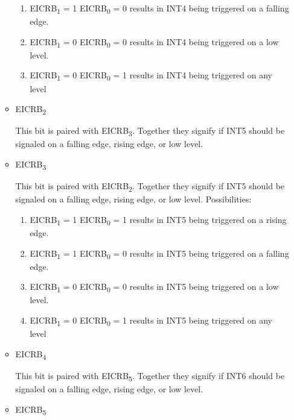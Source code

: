 \documentclass[12pt,letterpaper]{article}
\begin{document}
\begin{enumerate}
\begin{itemize}
\begin{enumerate}
				\item
				EICRB\textsubscript{1} = 1 EICRB\textsubscript{0} = 0 results in INT4 being triggered on a falling edge.
				
				\item
				EICRB\textsubscript{1} = 0 EICRB\textsubscript{0} = 0 results in INT4 being triggered on a low level.
				
				\item
				EICRB\textsubscript{1} = 0 EICRB\textsubscript{0} = 1 results in INT4 being triggered on any level
			\end{enumerate}

			\item
			EICRB\textsubscript{2}
			
			This bit is paired with EICRB\textsubscript{3}.
			Together they signify if INT5 should be signaled on a falling edge, rising edge, or low level.
			
			\item 
			EICRB\textsubscript{3}
			
			This bit is paired with EICRB\textsubscript{2}.
			Together they signify if INT5 should be signaled on a falling edge, rising edge, or low level.
			Possibilities: 
			\begin{enumerate}
				\item
				EICRB\textsubscript{1} = 1 EICRB\textsubscript{0} = 1 results in INT5 being triggered on a rising edge.
				
				\item
				EICRB\textsubscript{1} = 1 EICRB\textsubscript{0} = 0 results in INT5 being triggered on a falling edge.
				
				\item
				EICRB\textsubscript{1} = 0 EICRB\textsubscript{0} = 0 results in INT5 being triggered on a low level.
				
				\item
				EICRB\textsubscript{1} = 0 EICRB\textsubscript{0} = 1 results in INT5 being triggered on any level
			\end{enumerate}
		
			\item
			EICRB\textsubscript{4}
			
			This bit is paired with EICRB\textsubscript{5}.
			Together they signify if INT6 should be signaled on a falling edge, rising edge, or low level.
			
			\item 
			EICRB\textsubscript{5}
			

\end{itemize}
\end{enumerate}
\end{document}
